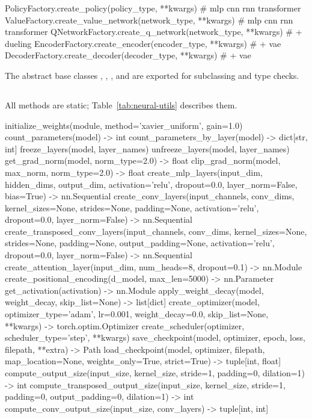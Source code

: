 \begin{pycode}
PolicyFactory.create_policy(policy_type, **kwargs)         # mlp cnn rnn transformer
ValueFactory.create_value_network(network_type, **kwargs)  # mlp cnn rnn transformer
QNetworkFactory.create_q_network(network_type, **kwargs)   # + dueling
EncoderFactory.create_encoder(encoder_type, **kwargs)      # + vae
DecoderFactory.create_decoder(decoder_type, **kwargs)      # + vae
\end{pycode}

The abstract base classes , ,
,  and  are exported
for subclassing and type checks.

\subsection{\texorpdfstring{}{NetworkUtils}}

All methods are static; Table~\ref{tab:neural-utils} describes them.

\begin{pycode}
initialize_weights(module, method='xavier_uniform', gain=1.0)
count_parameters(model) -> int
count_parameters_by_layer(model) -> dict[str, int]
freeze_layers(model, layer_names)
unfreeze_layers(model, layer_names)
get_grad_norm(model, norm_type=2.0) -> float
clip_grad_norm(model, max_norm, norm_type=2.0) -> float
create_mlp_layers(input_dim, hidden_dims, output_dim, activation='relu',
                  dropout=0.0, layer_norm=False, bias=True) -> nn.Sequential
create_conv_layers(input_channels, conv_dims, kernel_sizes=None, strides=None,
                   padding=None, activation='relu', dropout=0.0,
                   layer_norm=False) -> nn.Sequential
create_transposed_conv_layers(input_channels, conv_dims, kernel_sizes=None,
                              strides=None, padding=None, output_padding=None,
                              activation='relu', dropout=0.0,
                              layer_norm=False) -> nn.Sequential
create_attention_layer(input_dim, num_heads=8, dropout=0.1) -> nn.Module
create_positional_encoding(d_model, max_len=5000) -> nn.Parameter
get_activation(activation) -> nn.Module
apply_weight_decay(model, weight_decay, skip_list=None) -> list[dict]
create_optimizer(model, optimizer_type='adam', lr=0.001, weight_decay=0.0,
                 skip_list=None, **kwargs) -> torch.optim.Optimizer
create_scheduler(optimizer, scheduler_type='step', **kwargs)
save_checkpoint(model, optimizer, epoch, loss, filepath, **extra) -> Path
load_checkpoint(model, optimizer, filepath, map_location=None,
                weights_only=True, strict=True) -> tuple[int, float]
compute_output_size(input_size, kernel_size, stride=1, padding=0,
                    dilation=1) -> int
compute_transposed_output_size(input_size, kernel_size, stride=1, padding=0,
                               output_padding=0, dilation=1) -> int
compute_conv_output_size(input_size, conv_layers) -> tuple[int, int]
\end{pycode}

